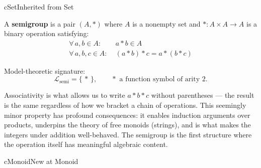 \begin{bpinh}{cSet}{Inherited from Set}
\end{bpinh}

\begin{definition}[Semigroup]
\label{def:formal-model-theoretic-structures-l379}
  A \textbf{semigroup} is a pair $(A, *)$ where $A$ is a nonempty set and
  $* : A \times A \to A$ is a binary operation satisfying:
  \begin{align*}
    \forall\,a,b \in A:&\; a * b \in A \tag{Closure}\\
    \forall\,a,b,c \in A:&\; (a * b) * c = a * (b * c) \tag{Associativity}
  \end{align*}

  \noindent
  Model-theoretic signature:
  \[
    \mathcal{L}_{\mathrm{semi}} = \{\,*\,\},
    \qquad * \text{ a function symbol of arity } 2.
  \]
\end{definition}

\begin{remark}
  Associativity is what allows us to write $a * b * c$ without parentheses ---
  the result is the same regardless of how we bracket a chain of operations.
  This seemingly minor property has profound consequences: it enables induction
  arguments over products, underpins the theory of free monoids (strings), and
  is what makes the integers under addition well-behaved.  The semigroup is the
  first structure where the operation itself has meaningful algebraic content.
\end{remark}



\clearpage\thispagestyle{plain}

\begin{bpnew}{cMonoid}{New at Monoid}
\end{bpnew}

